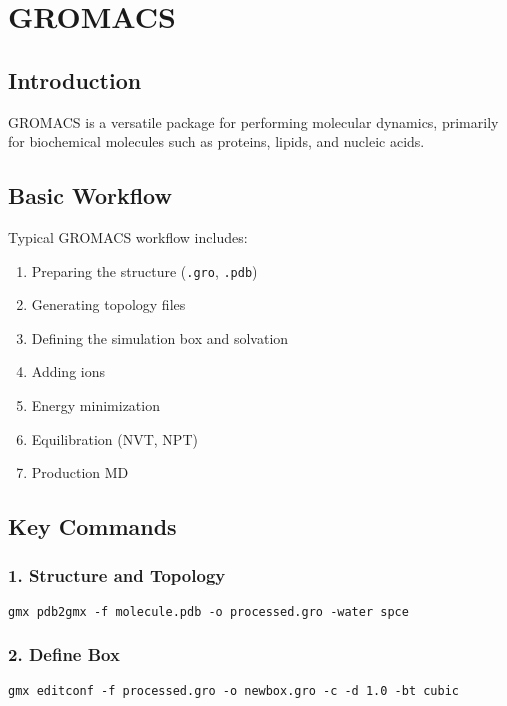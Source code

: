 
\chapter{GROMACS}

\section{Introduction}

GROMACS is a versatile package for performing molecular dynamics, primarily for biochemical molecules such as proteins, lipids, and nucleic acids.

\section{Basic Workflow}

Typical GROMACS workflow includes:

\begin{enumerate}
    \item Preparing the structure (\texttt{.gro}, \texttt{.pdb})
    \item Generating topology files
    \item Defining the simulation box and solvation
    \item Adding ions
    \item Energy minimization
    \item Equilibration (NVT, NPT)
    \item Production MD
\end{enumerate}

\section{Key Commands}

\subsection*{1. Structure and Topology}

\begin{verbatim}
gmx pdb2gmx -f molecule.pdb -o processed.gro -water spce
\end{verbatim}

\subsection*{2. Define Box}

\begin{verbatim}
gmx editconf -f processed.gro -o newbox.gro -c -d 1.0 -bt cubic
\end{verbatim}

